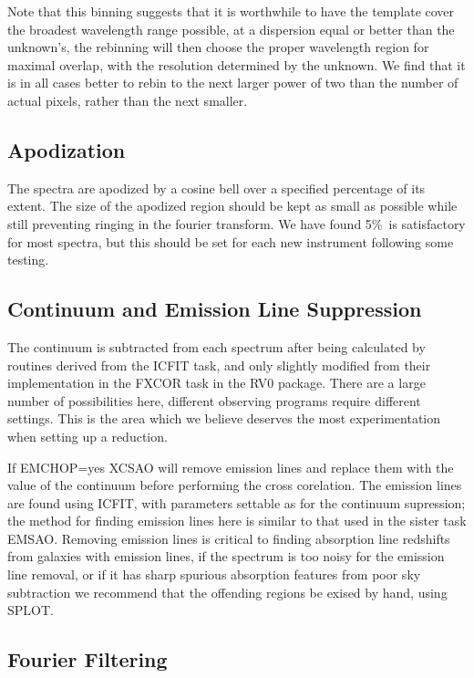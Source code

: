 Note that this binning suggests that it is
worthwhile to have the template cover the broadest wavelength range possible,
at a dispersion equal or better than the unknown's, the rebinning will then
choose the proper wavelength region for maximal overlap, with the resolution
determined by the unknown.  We find that it is in all cases better to rebin to
the next larger power of two than the number of actual pixels, rather than the
next smaller.

\subsection{Apodization}

The spectra are apodized by a cosine bell over a specified percentage of its
extent.  The size of the apodized region should be kept as small as possible
while still preventing ringing in the fourier transform.  We have found 5\%\ is
satisfactory for most spectra, but this should be set for each new instrument
following some testing.

\subsection{Continuum and Emission Line Suppression}

The continuum is subtracted from each spectrum after being calculated by
routines derived from the ICFIT task, and only slightly modified from their
implementation in the FXCOR task in the RV0 package.  There are a large number
of possibilities here, different observing programs require different settings. 
This is the area which we believe deserves the most experimentation when
setting up a reduction.

If EMCHOP=yes XCSAO will remove emission lines and replace them with the value
of the continuum before performing the cross
corelation.  The emission lines are found using ICFIT, with parameters
settable as for the continuum supression; the method for finding emission lines
here is similar to that used in the sister task EMSAO.  Removing emission lines
is critical to finding absorption line redshifts from galaxies with emission
lines, if the spectrum is too noisy for the emission line removal, or if it has
sharp spurious absorption features from poor sky subtraction we recommend that
the offending regions be exised by hand, using SPLOT.

\subsection{Fourier Filtering}

